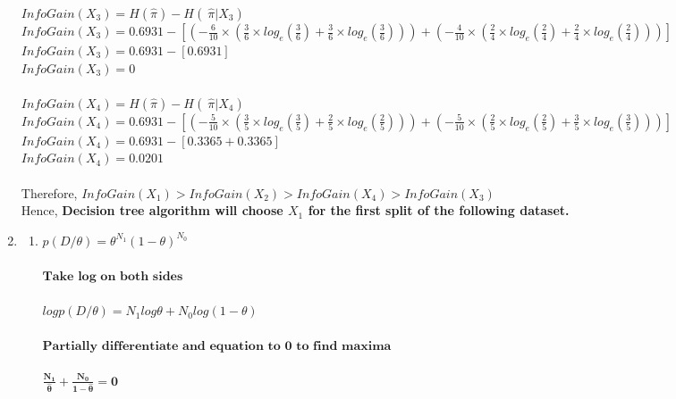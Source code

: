 \documentclass[12pt,a4paper]{article}
\begin{document}
\begin{enumerate}
	$InfoGain(X_3) = H\left( \hat{\pi} \right)-H\left(\ \hat{\pi} | X_3 \right)$\\
	$InfoGain(X_3) = 0.6931 - \left[ \left( -\frac{6}{10}\times\left( \frac{3}{6}\times log_e(\frac{3}{6})+\frac{3}{6}\times log_e(\frac{3}{6}) \right) \right)+ \left( -\frac{4}{10}\times\left( \frac{2}{4}\times log_e(\frac{2}{4})+\frac{2}{4}\times log_e(\frac{2}{4}) \right) \right) \right] $\\
	$InfoGain(X_3) = 0.6931 - \left[ 0.6931 \right]$\\
	$InfoGain(X_3) = 0$\\\\
	
	$InfoGain(X_4) = H\left( \hat{\pi} \right)-H\left(\ \hat{\pi} | X_4 \right)$\\
	$InfoGain(X_4) = 0.6931 - \left[ \left( -\frac{5}{10}\times\left( \frac{3}{5}\times log_e(\frac{3}{5})+\frac{2}{5}\times log_e(\frac{2}{5}) \right) \right)+ \left( -\frac{5}{10}\times\left( \frac{2}{5}\times log_e(\frac{2}{5})+\frac{3}{5}\times log_e(\frac{3}{5}) \right) \right) \right] $\\
	$InfoGain(X_4) = 0.6931 - \left[ 0.3365 + 0.3365 \right]$\\
	$InfoGain(X_4) = 0.0201$\\\\
	
	Therefore, $InfoGain(X_1) > InfoGain(X_2)>InfoGain(X_4)>InfoGain(X_3)$\\
	Hence, \textbf{Decision tree algorithm will choose $X_1$ for the first split of the following dataset.}\\
	
	\item
	\begin{enumerate}

	    \item 
	    $p(D/ \theta) = \theta^{N_1} {(1-\theta)}^{N_0}$ \\ \\
	   
	    $\textbf{Take log on both sides}$ \\ \\
	    $log p(D/ \theta) = N_1 log \theta + N_0 log (1 - \theta)$ \\ \\
 $\textbf{Partially differentiate and equation to 0 to find maxima}$ \\ \\
 $\mathbf{\frac{N_1}{\widehat{\theta}}+ \frac{N_0}{1 - \widehat{\theta}} = 0 }$ \\ \\
 

\end{enumerate}
\end{enumerate}
\end{document}
